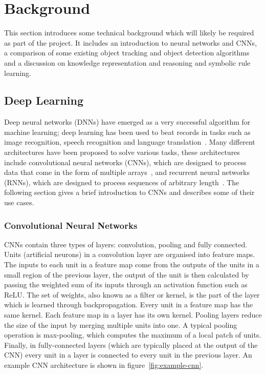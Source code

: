 \documentclass[../interim.tex]{subfiles}
\begin{document}
\section{Background}

This section introduces some technical background which will likely be required as part of the project. It includes an introduction to neural networks and CNNs, a comparison of some existing object tracking and object detection algorithms and a discussion on knowledge representation and reasoning and symbolic rule learning.

\subsection{Deep Learning}

Deep neural networks (DNNs) have emerged as a very successful algorithm for machine learning; deep learning has been used to beat records in tasks such as image recognition, speech recognition and language translation~\cite{deep-learning-intro}. Many different architectures have been proposed to solve various tasks, these architectures include convolutional neural networks (CNNs), which are designed to process data that come in the form of multiple arrays~\cite{deep-learning-intro}, and recurrent neural networks (RNNs), which are designed to process sequences of arbitrary length~\cite{def:rnn}. The following section gives a brief introduction to CNNs and describes some of their use cases.

\subsubsection{Convolutional Neural Networks}

CNNs contain three types of layers: convolution, pooling and fully connected. Units (artificial neurons) in a convolution layer are organised into feature maps. The inputs to each unit in a feature map come from the outputs of the units in a small region of the previous layer, the output of the unit is then calculated by passing the weighted sum of its inputs through an activation function such as ReLU. The set of weights, also known as a filter or kernel, is the part of the layer which is learned through backpropagation. Every unit in a feature map has the same kernel. Each feature map in a layer has its own kernel. Pooling layers reduce the size of the input by merging multiple units into one. A typical pooling operation is max-pooling, which computes the maximum of a local patch of units. Finally, in fully-connected layers (which are typically placed at the output of the CNN) every unit in a layer is connected to every unit in the previous layer. An example CNN architecture is shown in figure~\ref{fig:example-cnn}.
\end{document}

